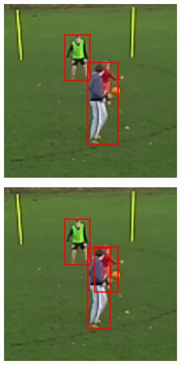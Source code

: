 \documentclass{article}
\begin{document}
\begin{figure}[h!]
\begin{subfigure}[b]{0.5\linewidth}
	\includegraphics[scale=0.4]{report/pic/3_new/off_2.jpg} 
  \end{subfigure}
  \begin{subfigure}[b]{0.5\linewidth}
  \centering
	\includegraphics[scale=0.4]{report/pic/3_new/on_2.jpg} 
  \end{subfigure}
  \begin{subfigure}[b]{0.5\linewidth}
  \centering

\end{subfigure}
\end{figure}
\end{document}
